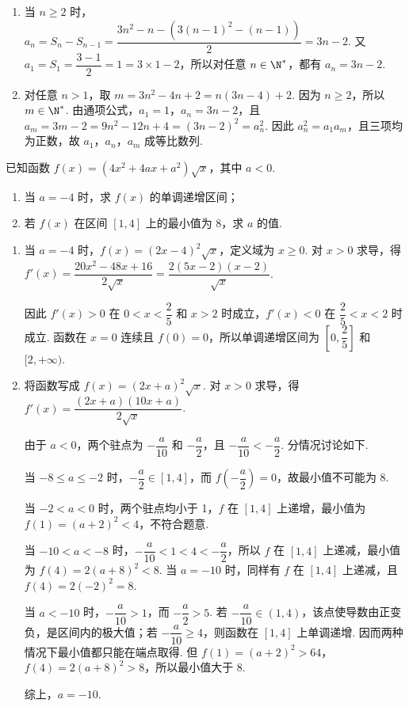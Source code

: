 \begin{solution}
\begin{enumerate}
\item 当 \(n\geqslant2\) 时，
\(a_n=S_n-S_{n-1}=\dfrac{3n^2-n-\left(3(n-1)^2-(n-1)\right)}{2}=3n-2\). 又 \(a_1=S_1=\dfrac{3-1}{2}=1=3\times1-2\)，所以对任意 \(n\in\N^*\)，都有 \(a_n=3n-2\).
\item 对任意 \(n>1\)，取 \(m=3n^2-4n+2=n(3n-4)+2\). 因为 \(n\geqslant2\)，所以 \(m\in\N^*\). 由通项公式，\(a_1=1\)，\(a_n=3n-2\)，且
\(a_m=3m-2=9n^2-12n+4=(3n-2)^2=a_n^2\).
因此 \(a_n^2=a_1a_m\)，且三项均为正数，故 \(a_1\)，\(a_n\)，\(a_m\) 成等比数列.
\end{enumerate}
\end{solution}

\begin{problem}
已知函数 \( f(x) = (4x^{2} + 4ax + a^{2})\sqrt{x} \)，其中 \( a < 0 \).
\begin{enumerate}
\item 当 \(a = -4\) 时，求 \(f(x)\) 的单调递增区间；
\item 若 \( f(x) \) 在区间 \( [1,4] \) 上的最小值为 8，求 \(a\) 的值.
\end{enumerate}
\end{problem}

\begin{solution}
\begin{enumerate}
\item 当 \(a=-4\) 时，\(f(x)=(2x-4)^2\sqrt{x}\)，定义域为 \(x\geqslant0\). 对 \(x>0\) 求导，得
\(f'(x)=\dfrac{20x^2-48x+16}{2\sqrt{x}}=\dfrac{2(5x-2)(x-2)}{\sqrt{x}}\).

因此 \(f'(x)>0\) 在 \(0<x<\dfrac25\) 和 \(x>2\) 时成立，\(f'(x)<0\) 在 \(\dfrac25<x<2\) 时成立. 函数在 \(x=0\) 连续且 \(f(0)=0\)，所以单调递增区间为 \(\left[0,\dfrac25\right]\) 和 \([2,+\infty)\).
\item 将函数写成 \(f(x)=(2x+a)^2\sqrt{x}\). 对 \(x>0\) 求导，得
\(f'(x)=\dfrac{(2x+a)(10x+a)}{2\sqrt{x}}\).

由于 \(a<0\)，两个驻点为 \(-\dfrac a{10}\) 和 \(-\dfrac a2\)，且 \(-\dfrac a{10}<-\dfrac a2\). 分情况讨论如下.

当 \(-8\leqslant a\leqslant-2\) 时，\(-\dfrac a2\in[1,4]\)，而 \(f\left(-\dfrac a2\right)=0\)，故最小值不可能为 8.

当 \(-2<a<0\) 时，两个驻点均小于 1，\(f\) 在 \([1,4]\) 上递增，最小值为 \(f(1)=(a+2)^2<4\)，不符合题意.

当 \(-10<a<-8\) 时，\(-\dfrac a{10}<1<4<-\dfrac a2\)，所以 \(f\) 在 \([1,4]\) 上递减，最小值为 \(f(4)=2(a+8)^2<8\). 当 \(a=-10\) 时，同样有 \(f\) 在 \([1,4]\) 上递减，且 \(f(4)=2(-2)^2=8\).

当 \(a<-10\) 时，\(-\dfrac a{10}>1\)，而 \(-\dfrac a2>5\). 若 \(-\dfrac a{10}\in(1,4)\)，该点使导数由正变负，是区间内的极大值；若 \(-\dfrac a{10}\geqslant4\)，则函数在 \([1,4]\) 上单调递增. 因而两种情况下最小值都只能在端点取得. 但 \(f(1)=(a+2)^2>64\)，\(f(4)=2(a+8)^2>8\)，所以最小值大于 8.

综上，\(a=-10\).
\end{enumerate}
\end{solution}

